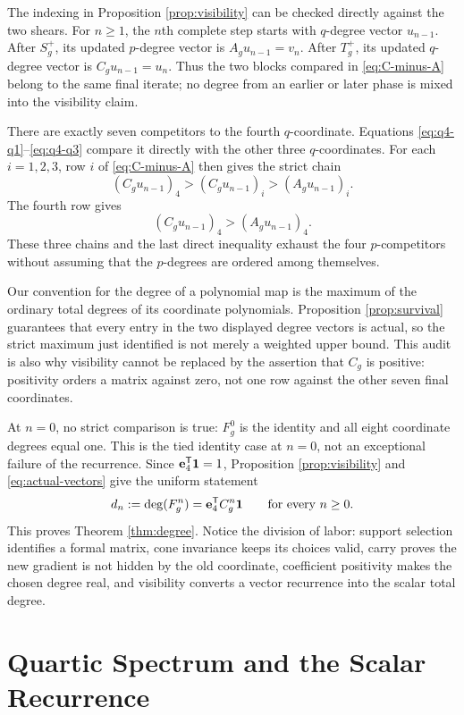 \documentclass[11pt]{article}
\theoremstyle{remark}
\numberwithin{equation}{section}
\begin{document}
The indexing in Proposition \ref{prop:visibility} can be checked directly
against the two shears.  For \(n\geq1\), the \(n\)th complete step starts
with \(q\)-degree vector \(u_{n-1}\).  After \(S_g^+\), its updated
\(p\)-degree vector is \(A_gu_{n-1}=v_n\).  After \(T_g^+\), its updated
\(q\)-degree vector is \(C_gu_{n-1}=u_n\).  Thus the two blocks compared in
\eqref{eq:C-minus-A} belong to the same final iterate; no degree from an
earlier or later phase is mixed into the visibility claim.

There are exactly seven competitors to the fourth \(q\)-coordinate.
Equations \eqref{eq:q4-q1}--\eqref{eq:q4-q3} compare it directly with the
other three \(q\)-coordinates.  For each \(i=1,2,3\), row \(i\) of
\eqref{eq:C-minus-A} then gives the strict chain
\[
(C_gu_{n-1})_4>(C_gu_{n-1})_i>(A_gu_{n-1})_i.
\]
The fourth row gives
\[
(C_gu_{n-1})_4>(A_gu_{n-1})_4.
\]
These three chains and the last direct inequality exhaust the four
\(p\)-competitors without assuming that the \(p\)-degrees are ordered among
themselves.

Our convention for the degree of a polynomial map is the maximum of the
ordinary total degrees of its coordinate polynomials.  Proposition
\ref{prop:survival} guarantees that every entry in the two displayed degree
vectors is actual, so the strict maximum just identified is not merely a
weighted upper bound.  This audit is also why visibility cannot be replaced
by the assertion that \(C_g\) is positive: positivity orders a matrix
against zero, not one row against the other seven final coordinates.

At \(n=0\), no strict comparison is true: \(F_g^0\) is the identity and all
eight coordinate degrees equal one.  This is the tied identity case at
\(n=0\), not an exceptional failure of the recurrence.  Since
\(\mathbf{e}_4^{\mathsf{T}}\mathbf{1}=1\), Proposition \ref{prop:visibility} and
\eqref{eq:actual-vectors} give the uniform statement
\begin{equation}\label{eq:degree-all-n}
d_n:=\operatorname{deg}(F_g^n)=\mathbf{e}_4^{\mathsf{T}}C_g^n\mathbf{1}
\qquad\text{for every }n\geq0.
\end{equation}
This proves Theorem \ref{thm:degree}.  Notice the division of labor:
support selection identifies a formal matrix, cone invariance keeps its
choices valid, carry proves the new gradient is not hidden by the old
coordinate, coefficient positivity makes the chosen degree real, and
visibility converts a vector recurrence into the scalar total degree.

\section{Quartic Spectrum and the Scalar Recurrence}\label{sec:spectrum}
\end{document}
